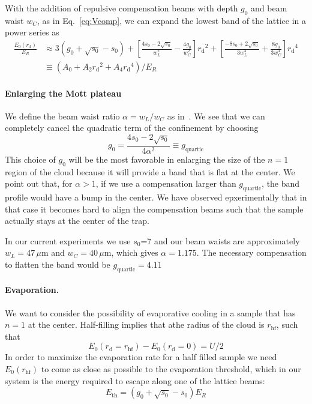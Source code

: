 \documentclass[11pt,letter]{article}
\newcommand{\rdiag}{\ensuremath{ r_{\text{d}} } }
\begin{document}
With the addition of repulsive compensation beams with depth $g_{0}$ and beam
waist $w_{C}$,  as in Eq.~\ref{eq:Vcomp},  we can expand the lowest band of the
lattice in a power series as  
\begin{equation}
\begin{split} 
  \frac{E_{0}(\rdiag)}{E_{R}}  & \approx   
  3( g_{0} + \sqrt{s_{0}} - s_{0} ) 
  + \left[ 
    \frac{ 4s_{0} - 2\sqrt{s_{0}} }{w_{L}^{2} } 
   - 
  \frac{ 4 g_{0} }{ w_{C}^{2}} \right]
  \rdiag^{2} 
  +  \left[  \frac{ - 8 s_{0} + 2\sqrt{s_{0}} }{3 w_{L}^{4} } + 
    \frac{ 8 g_{0} }{3 w_{C}^{4} }  \right] \rdiag^{4}   \\
 &  \equiv  ( A_{0} + A_{2} \rdiag^{2} + A_{4} \rdiag^{4}  ) / E_{R}
\end{split}
\end{equation}

\paragraph{Enlarging the Mott plateau} We define  the beam waist ratio $\alpha
= w_{L}/w_{C}$ as in~\cite{Mathy2012}.  We see that we can completely cancel
the quadratic term of the confinement by choosing 
\begin{equation}
 g_{0} = \frac{  4 s_{0} - 2 \sqrt{s_{0}} }{ 4 \alpha^{2} }  
  \equiv g_{\text{quartic}} 
\end{equation}
This choice of $g_{0}$ will be the most favorable in enlarging the size of the
$n=1$ region of the cloud because it will provide a band that is flat at the
center.  We point out that, for $\alpha > 1$,  if we use a compensation larger
than $g_{\text{quartic}}$, the band profile would have a bump in the center.
We have observed epxerimentally that in that case it becomes hard to align the
compensation beams such that the sample actually stays at the center of the
trap.

In our current experiments we use $s_{0}$=7 and our beam waists are
approximately $w_{L}=47\,\mu$m and $w_{C}=40\,\mu$m, which gives
$\alpha=1.175$.  The necessary compensation to flatten the band would be
$g_{\text{quartic}} =  4.11 $




\paragraph{Evaporation.} We want to consider the possibility of evaporative
cooling in a sample that has $n=1$ at the center.  Half-filling implies that
athe radius of the cloud is $r_{\text{hf}}$, such that 
\begin{equation} 
  E_{0}(\rdiag = r_{\text{hf}} ) -  E_{0}( \rdiag=0 ) =  U/2
  \label{eq:half-filling-radius} 
\end{equation}  
In order to maximize the evaporation rate for a half filled sample we need
$E_{0}(r_{\text{hf}})$ to come as close as possible to the evaporation
threshold, which in our system is the energy required to escape along one of
the lattice beams: 
\begin{equation} 
  E_{\text{th}} = ( g_{0} + \sqrt{s_{0}} - s_{0} ) E_{R} 
\end{equation}
\end{document}
